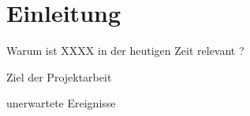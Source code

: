 %

\section{Einleitung}

	\begin{frame}{Warum ist XXXX in der heutigen Zeit relevant ?}
	\end{frame}

	\begin{frame}{Ziel der Projektarbeit}
	\end{frame}

	\begin{frame}{unerwartete Ereignisse}
	\end{frame}

	
